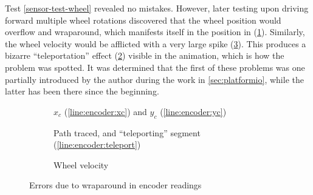 \documentclass[main.tex]{subfiles}
\begin{document}
		Test \ref{sensor-test-wheel} revealed no mistakes.
		However, later testing upon driving forward multiple wheel rotations discovered that the wheel position would overflow and wraparound, which manifests itself in the position in (\cref{fig:bad-wheel:pos}). Similarly, the wheel velocity would be afflicted with a very large spike (\cref{fig:bad-wheel:vel}). This produces a bizarre \enquote{teleportation} effect (\cref{fig:bad-wheel:tele}) visible in the animation, which is how the problem was spotted.
		It was determined that the first of these problems was one partially introduced by the author during the work in \cref{sec:platformio}, while the latter has been there since the beginning.

		\begin{figure}
			\newlength{\mypadding}
			\setlength{\mypadding}{1.5cm}
			\newlength{\mywidth}
			\setlength{\mywidth}{(\linewidth-2\mypadding)/3}
			\begin{subfigure}[t]{\mywidth}
				
				\caption{$x_c$ (\ref{line:encoder:xc}) and $y_c$ (\ref{line:encoder:yc})}
				\label{fig:bad-wheel:pos}
			\end{subfigure}\hfill
			\begin{subfigure}[t]{\mywidth}
				
				\caption{Path traced, and \enquote{teleporting} segment (\ref{line:encoder:teleport})}
				\label{fig:bad-wheel:tele}
			\end{subfigure}\hfill
			\begin{subfigure}[t]{\mywidth}
				
				\caption{Wheel velocity}
				\label{fig:bad-wheel:vel}
			\end{subfigure}
			\caption{Errors due to wraparound in encoder readings}
			\label{fig:bad-wheel}
		\end{figure}
\end{document}
